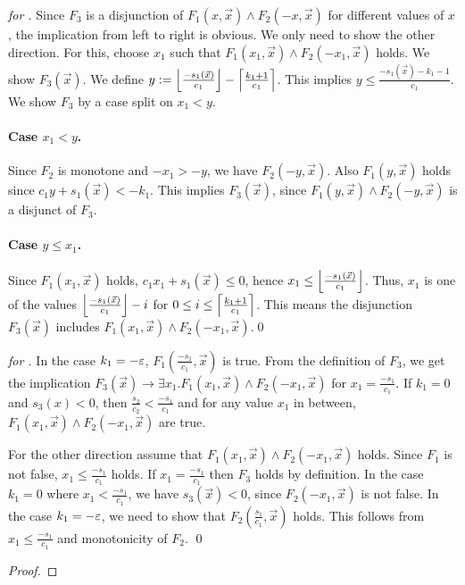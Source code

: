 \begin{techreport}
\ifnewinterpolation
\begin{proof}[for \laz]
%
Since $F_3$ is a disjunction of $F_1(x, \vec x) \land F_2(-x, \vec x)$
for different values of $x$, the implication from left to right is obvious.
We only need to show the other direction.  
For this, choose $x_1$ such that $F_1(x_1,\vec x) \land F_2(-x_1, \vec x)$ 
holds. We show $F_3(\vec x)$.
We define $y := \left\lfloor \frac{-s_1(\vec x)}{c_1} \right\rfloor -
\left\lceil \frac{k_1+1}{c_1} \right\rceil$.  This implies $y \leq \frac{-s_1(\vec x)-k_1-1}{c_1}$.
We show $F_3$ by a case split on $x_1 < y$.

\paragraph{Case $x_1 < y$.}
Since $F_2$ is monotone and $-x_1 > -y$, we have $F_2(-y,\vec x)$.  Also
$F_1(y,\vec x)$ holds since $c_1 y + s_1(\vec x) < -k_1$.  This 
implies $F_3(\vec x)$,
since $F_1(y,\vec x)\land F_2(-y,\vec x)$ is a disjunct of $F_3$.

\paragraph{Case $y \leq x_1$.}
Since $F_1(x_1,\vec x)$ holds, $c_1 x_1 + s_1(\vec x) \leq 0$, hence
$x_1 \leq \left\lfloor \frac{-s_1(\vec x)}{c_1} \right\rfloor$.  Thus, $x_1$ is one of the values
$\left\lfloor \frac{-s_1(\vec x)}{c_1} \right\rfloor - i$ for $0 \leq i \leq \left\lceil \frac{k_1+1}{c_1} \right\rceil$.
This means the disjunction $F_3(\vec x)$ includes $F_1(x_1,\vec x)\land F_2(-x_1,\vec x)$.\qed
\end{proof}

\begin{proof}[for \laq]
In the case $k_1 = -\varepsilon$, $F_1(\frac{-s_1}{c_1},\vec x)$ is true.
From the definition of $F_3$, we get the implication $F_3(\vec x)
\rightarrow \exists x_1. F_1(x_1,\vec x) \land F_2(-x_1,\vec x)$ for
$x_1= \frac{-s_1}{c_1}$.  If $k_1 = 0$ and $s_3(x) < 0$, then
$\frac{s_2}{c_2} < \frac{-s_1}{c_1}$ and for any value $x_1$ in between,
$F_1(x_1,\vec x) \land F_2(-x_1,\vec x)$ are true.

For the other direction assume that $F_1(x_1, \vec x) \land F_2(-x_1, \vec x)$
holds.  Since $F_1$ is not false, $x_1\leq \frac{-s_1}{c_1}$ holds.
If $x_1 = \frac{-s_1}{c_1}$ then $F_3$ holds by definition.
In the case $k_1 = 0$ where $x_1 < \frac{-s_1}{c_1}$, we have 
$s_3(\vec x) < 0$, since $F_2(-x_1, \vec x)$ is not false.  
In the case $k_1 = -\varepsilon$, we need to show that $F_2(\frac{s_1}{c_1},\vec x)$
holds. This follows from $x_1\leq \frac{-s_1}{c_1}$ and monotonicity of $F_2$.
\qed
\end{proof}
\else
\begin{proof}


\end{proof}
\end{techreport}
